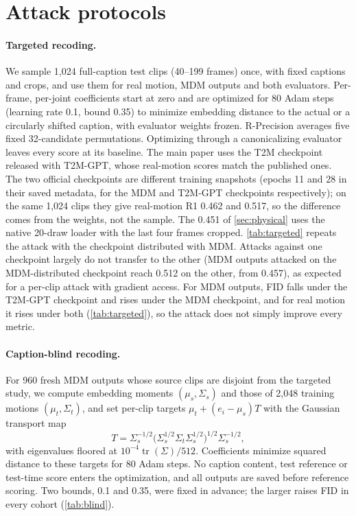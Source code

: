 \documentclass[10pt,twocolumn,letterpaper]{article}
\begin{document}
\section{Attack protocols}\label{sec:attacks}
\paragraph{Targeted recoding.} We sample 1,024 full-caption test clips (40--199 frames) once, with fixed captions and crops, and use them for real motion, MDM outputs and both evaluators. Per-frame, per-joint coefficients start at zero and are optimized for 80 Adam steps (learning rate 0.1, bound 0.35) to minimize embedding distance to the actual or a circularly shifted caption, with evaluator weights frozen. R-Precision averages five fixed 32-candidate permutations. Optimizing through a canonicalizing evaluator leaves every score at its baseline. The main paper uses the T2M checkpoint released with T2M-GPT, whose real-motion scores match the published ones. The two official checkpoints are different training snapshots (epochs 11 and 28 in their saved metadata, for the MDM and T2M-GPT checkpoints respectively); on the same 1,024 clips they give real-motion R1 0.462 and 0.517, so the difference comes from the weights, not the sample. The 0.451 of \cref{sec:physical} uses the native 20-draw loader with the last four frames cropped. \cref{tab:targeted} repeats the attack with the checkpoint distributed with MDM. Attacks against one checkpoint largely do not transfer to the other (MDM outputs attacked on the MDM-distributed checkpoint reach 0.512 on the other, from 0.457), as expected for a per-clip attack with gradient access. For MDM outputs, FID falls under the T2M-GPT checkpoint and rises under the MDM checkpoint, and for real motion it rises under both (\cref{tab:targeted}), so the attack does not simply improve every metric.



\paragraph{Caption-blind recoding.} For 960 fresh MDM outputs whose source clips are disjoint from the targeted study, we compute embedding moments $(\mu_s,\Sigma_s)$ and those of 2,048 training motions $(\mu_t,\Sigma_t)$, and set per-clip targets $\mu_t+(e_i-\mu_s)T$ with the Gaussian transport map~\cite{bhatia2017}
\begin{equation}
T=\Sigma_s^{-1/2}\bigl(\Sigma_s^{1/2}\Sigma_t\Sigma_s^{1/2}\bigr)^{1/2}\Sigma_s^{-1/2},
\end{equation}
with eigenvalues floored at $10^{-4}\operatorname{tr}(\Sigma)/512$. Coefficients minimize squared distance to these targets for 80 Adam steps. No caption content, test reference or test-time score enters the optimization, and all outputs are saved before reference scoring. Two bounds, 0.1 and 0.35, were fixed in advance; the larger raises FID in every cohort (\cref{tab:blind}).
\end{document}
